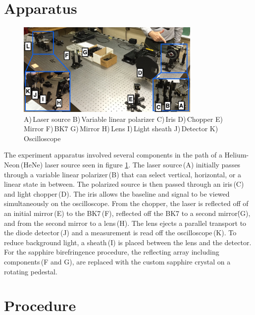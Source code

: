 \documentclass[aps,prl,twocolumn,superscriptaddress,nofootinbib]{revtex4-1}
\begin{document}

\section{Apparatus}


\begin{figure}[h!]
  \begin{center}
\centerline{\includegraphics[width=3.5in]{apparatus.jpg}}
\caption{\small{A)\,Laser source B)\,Variable linear polarizer C)\,Iris D)\,Chopper E)\,Mirror F)\,BK7 G)\,Mirror H)\,Lens I)\,Light sheath J)\,Detector K)\,Oscilloscope \label{app1}}}
  \end{center}
\end{figure}
\vspace{-.7cm}
\vfill\eject
The experiment apparatus involved several components in the path of a Helium-Neon\,(HeNe) laser source seen in figure \ref{app1}. The laser source\,(A) initially passes through a variable linear polarizer\,(B) that can select vertical, horizontal, or a linear state in between. The polarized source is then passed through an iris\,(C) and light chopper\,(D). The iris allows the baseline and signal to be viewed simultaneously on the oscilloscope. From the chopper, the laser is reflected off of an initial mirror\,(E) to the BK7\,(F), reflected off the BK7 to a second mirror\.(G), and from the second mirror to a lens\,(H). The lens ejects a parallel transport to the diode detector\,(J) and a measurement is read off the oscilloscope\,(K). To reduce background light, a sheath\,(I) is placed between the lens and the detector. For the sapphire birefringence procedure, the reflecting array including components\,(F and G), are replaced with the custom sapphire crystal on a rotating pedestal.



\section{Procedure}
\end{document}
